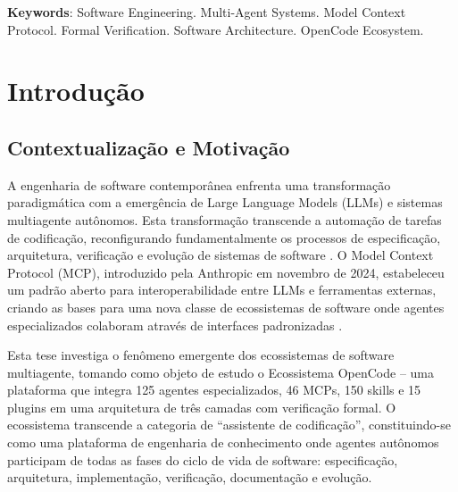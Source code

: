 \documentclass[12pt,a4paper,sumario=tradicional]{abntex2}
\begin{document}
\vspace{0.5cm}
\textbf{Keywords}: Software Engineering. Multi-Agent Systems. Model Context Protocol. Formal Verification. Software Architecture. OpenCode Ecosystem.

\newpage
\listoffigures
\vspace{1cm}
\listoftables

\newpage
\tableofcontents
\newpage

\chapter{Introdução}

\section{Contextualização e Motivação}

A engenharia de software contemporânea enfrenta uma transformação paradigmática com a emergência de Large Language Models (LLMs) e sistemas multiagente autônomos. Esta transformação transcende a automação de tarefas de codificação, reconfigurando fundamentalmente os processos de especificação, arquitetura, verificação e evolução de sistemas de software \cite{garfinkel2026acm}. O Model Context Protocol (MCP), introduzido pela Anthropic em novembro de 2024, estabeleceu um padrão aberto para interoperabilidade entre LLMs e ferramentas externas, criando as bases para uma nova classe de ecossistemas de software onde agentes especializados colaboram através de interfaces padronizadas \cite{ayyagari2025mcp}.

Esta tese investiga o fenômeno emergente dos ecossistemas de software multiagente, tomando como objeto de estudo o Ecossistema OpenCode -- uma plataforma que integra 125 agentes especializados, 46 MCPs, 150 skills e 15 plugins em uma arquitetura de três camadas com verificação formal. O ecossistema transcende a categoria de ``assistente de codificação'', constituindo-se como uma plataforma de engenharia de conhecimento onde agentes autônomos participam de todas as fases do ciclo de vida de software: especificação, arquitetura, implementação, verificação, documentação e evolução.
\end{document}
